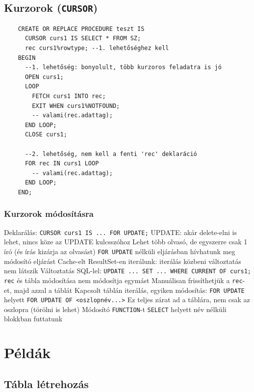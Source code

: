 \documentclass[12pt,a4paper]{article}
\begin{document}
\pagebreak

\subsection{Kurzorok (\texttt{CURSOR})}

\begin{verbatim}
	CREATE OR REPLACE PROCEDURE teszt IS
	  CURSOR curs1 IS SELECT * FROM SZ;
	  rec curs1%rowtype; --1. lehetőséghez kell
	BEGIN
	  --1. lehetőség: bonyolult, több kurzoros feladatra is jó
	  OPEN curs1;
	  LOOP 
	    FETCH curs1 INTO rec;
	    EXIT WHEN curs1%NOTFOUND;
	    -- valami(rec.adattag);
	  END LOOP;
	  CLOSE curs1;
	  
	  --2. lehetőség, nem kell a fenti 'rec' deklaráció
	  FOR rec IN curs1 LOOP
	    -- valami(rec.adattag);
	  END LOOP;
	END;\end{verbatim}

\subsubsection{Kurzorok módosításra}

\begin{outline}
	\1 Deklarálás: \texttt{CURSOR curs1 IS ... FOR UPDATE;}
		\2 UPDATE: akár delete-elni is lehet, nincs köze az UPDATE kulcsszóhoz
	\1 Lehet több olvasó, de egyszerre csak 1 író (és írás kizárja az olvasást)
		\2 \texttt{FOR UPDATE} nélküli eljárásban hívhatunk meg módosító eljárást
	\1 Cache-elt ResultSet-en iterálunk: iterálás közbeni változtatás nem látszik
	\1 Változtatás SQL-lel: \texttt{UPDATE ... SET ... WHERE CURRENT OF curs1;}
		\2 \texttt{rec} és tábla módosítása nem módosítja egymást
		\2 Manuálisan frissíthetjük a \texttt{rec}-et, majd azzal a táblát
	\1 Kapcsolt táblán iterálás, egyiken módosítás:
		\2 \texttt{FOR UPDATE} helyett \texttt{FOR UPDATE OF <oszlopnév...>}
		\2 Ez teljes zárat ad a táblára, nem csak az oszlopra (törölni is lehet)
	\1 Módosító \texttt{FUNCTION}-t \texttt{SELECT} helyett név nélküli blokkban futtatunk
\end{outline}

\pagebreak

\section{Példák}

\subsection{Tábla létrehozás}
\end{document}
